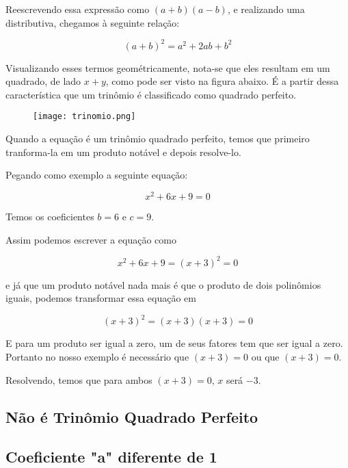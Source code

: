 \documentclass[../resumo.tex]{subfiles}
\begin{document}
	Reescrevendo essa expressão como \((a + b)(a - b)\), e realizando uma distributiva, chegamos
	à seguinte relação:

	\[(a + b)^2 = a^2 + 2ab + b^2\]

	Visualizando esses termos geométricamente, nota-se que eles resultam em um quadrado,
	de lado \(x + y\), como pode ser visto na figura abaixo. É a partir dessa característica
	que um trinômio é classificado como quadrado perfeito.

	\begin{figure}[H]
		\centering
		\texttt{[image: trinomio.png]}
		\label{fig: Visualização geométrica do trinômio quadrado perfeito}
	\end{figure}



	Quando a equação é um trinômio quadrado perfeito, temos que primeiro tranforma-la em um produto notável
	e depois resolve-lo.

	Pegando como exemplo a seguinte equação:

	\[ x^2 + 6x + 9 = 0 \]

	Temos os coeficientes $b = 6$ e $c = 9$.

	Assim podemos escrever a equação como

	\[ x^2 + 6x + 9 = (x + 3)^2 = 0 \]

	e já que um produto notável nada mais é que o produto de dois polinômios iguais, podemos transformar 
	essa equação em

	\[ (x + 3)^2 = (x + 3)(x + 3) = 0 \]

	E para um produto ser igual a zero, um de seus fatores tem que ser igual a zero. Portanto no nosso exemplo
	é necessário que $(x + 3) = 0$ ou que $(x + 3) = 0$.

	Resolvendo, temos que para ambos $(x + 3) = 0$, $x$ será $-3$. 

	\subsection{Não é Trinômio Quadrado Perfeito}

	\subsection{Coeficiente "a" diferente de 1}
\end{document}
